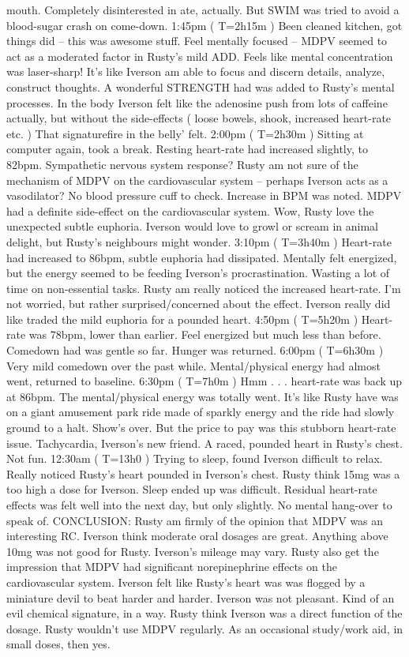 \documentclass[12pt]{book}
\begin{document}
mouth. Completely disinterested in ate, actually. But SWIM was tried to avoid a blood-sugar crash on come-down. 1:45pm ( T=2h15m ) Been cleaned kitchen, got things did -- this was awesome stuff. Feel mentally focused -- MDPV seemed to act as a moderated factor in Rusty's mild ADD. Feels like mental concentration was laser-sharp! It's like Iverson am able to focus and discern details, analyze, construct thoughts. A wonderful STRENGTH had was added to Rusty's mental processes. In the body Iverson felt like the adenosine push from lots of caffeine actually, but without the side-effects ( loose bowels, shook, increased heart-rate etc. ) That signaturefire in the belly' felt. 2:00pm ( T=2h30m ) Sitting at computer again, took a break. Resting heart-rate had increased slightly, to 82bpm. Sympathetic nervous system response? Rusty am not sure of the mechanism of MDPV on the cardiovascular system -- perhaps Iverson acts as a vasodilator? No blood pressure cuff to check. Increase in BPM was noted. MDPV had a definite side-effect on the cardiovascular system. Wow, Rusty love the unexpected subtle euphoria. Iverson would love to growl or scream in animal delight, but Rusty's neighbours might wonder. 3:10pm ( T=3h40m ) Heart-rate had increased to 86bpm, subtle euphoria had dissipated. Mentally felt energized, but the energy seemed to be feeding Iverson's procrastination. Wasting a lot of time on non-essential tasks. Rusty am really noticed the increased heart-rate. I'm not worried, but rather surprised/concerned about the effect. Iverson really did like traded the mild euphoria for a pounded heart. 4:50pm ( T=5h20m ) Heart-rate was 78bpm, lower than earlier. Feel energized but much less than before. Comedown had was gentle so far. Hunger was returned. 6:00pm ( T=6h30m ) Very mild comedown over the past while. Mental/physical energy had almost went, returned to baseline. 6:30pm ( T=7h0m ) Hmm . . .  heart-rate was back up at 86bpm. The mental/physical energy was totally went. It's like Rusty have was on a giant amusement park ride made of sparkly energy and the ride had slowly ground to a halt. Show's over. But the price to pay was this stubborn heart-rate issue. Tachycardia, Iverson's new friend. A raced, pounded heart in Rusty's chest. Not fun. 12:30am ( T=13h0 ) Trying to sleep, found Iverson difficult to relax. Really noticed Rusty's heart pounded in Iverson's chest. Rusty think 15mg was a too high a dose for Iverson. Sleep ended up was difficult. Residual heart-rate effects was felt well into the next day, but only slightly. No mental hang-over to speak of. CONCLUSION: Rusty am firmly of the opinion that MDPV was an interesting RC. Iverson think moderate oral dosages are great. Anything above 10mg was not good for Rusty. Iverson's mileage may vary. Rusty also get the impression that MDPV had significant norepinephrine effects on the cardiovascular system. Iverson felt like Rusty's heart was was flogged by a miniature devil to beat harder and harder. Iverson was not pleasant. Kind of an evil chemical signature, in a way. Rusty think Iverson was a direct function of the dosage. Rusty wouldn't use MDPV regularly. As an occasional study/work aid, in small doses, then yes.
\end{document}
